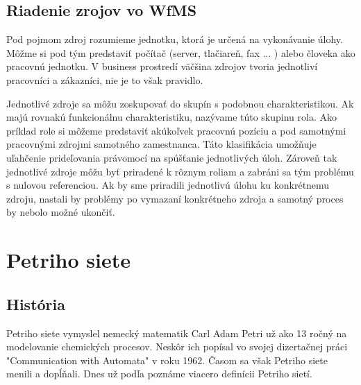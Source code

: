 \subsection{Riadenie zrojov vo WfMS}
Pod pojmom zdroj rozumieme jednotku, ktorá je určená na vykonávanie úlohy. Môžme si pod tým predstaviť počítač (server, tlačiareň, fax ... ) alebo človeka ako pracovnú jednotku. V business prostredí väčšina zdrojov tvoria jednotliví pracovníci a zákazníci, nie je to však pravidlo.

Jednotlivé zdroje sa môžu zoskupovať do skupín s podobnou charakteristikou. Ak majú rovnakú funkcionálnu charakteristiku, nazývame túto skupinu rola.
Ako príklad role si môžeme predstaviť akúkoľvek pracovnú pozíciu a pod samotnými pracovnými zdrojmi samotného zamestnanca. Táto klasifikácia umožňuje uľahčenie prideľovania právomocí na spúšťanie jednotlivých úloh. Zároveň tak jednotlivé zdroje môžu byť priradené k rôznym roliam a zabráni sa tým problému s nulovou referenciou. Ak by sme priradili jednotlivú úlohu ku konkrétnemu zdroju, nastali by problémy po vymazaní konkrétneho zdroja a samotný proces by nebolo možné ukončiť.







\section{Petriho siete}




\subsection{História}
Petriho siete vymyslel nemecký matematik Carl Adam Petri už ako 13 ročný na modelovanie chemických procesov. Neskôr ich popísal vo svojej dizertačnej práci "Communication with Automata" \cite{petri} v roku 1962. Časom sa však Petriho siete menili a dopĺňali. Dnes už podľa \cite{gabova_kniha} poznáme viacero definícii Petriho sietí. 


